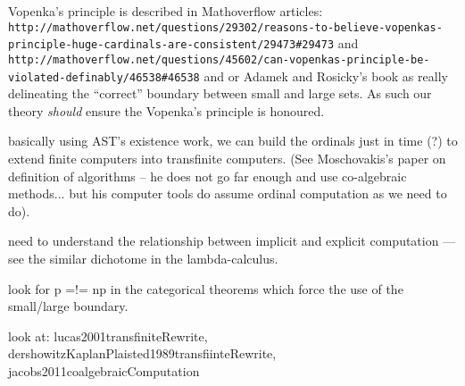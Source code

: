 \documentclass[a4paper,openany]{amsbook}
\begin{document}
Vopenka's principle is described in Mathoverflow articles:
\verb|http://mathoverflow.net/questions/29302/reasons-to-believe-vopenkas-principle-huge-cardinals-are-consistent/29473#29473|
and
\verb|http://mathoverflow.net/questions/45602/can-vopenkas-principle-be-violated-definably/46538#46538|
and or Adamek and Rosicky's book as really delineating the ``correct'' boundary
between small and large sets. As such our theory \emph{should} ensure the
Vopenka's principle is honoured.

basically using AST's existence work, we can build the ordinals just in time (?)
to extend finite computers into transfinite computers. (See Moschovakis's paper
on definition of algorithms -- he does not go far enough and use co-algebraic
methods... but his computer tools do assume ordinal computation as we need to
do).

need to understand the relationship between implicit and explicit computation
--- see the similar dichotome in the lambda-calculus.

look for p =!= np in the categorical theorems which force the use of the
small/large boundary.

look at: lucas2001transfiniteRewrite,
dershowitzKaplanPlaisted1989transfiinteRewrite,
jacobs2011coalgebraicComputation

\printbibliography
\end{document}

